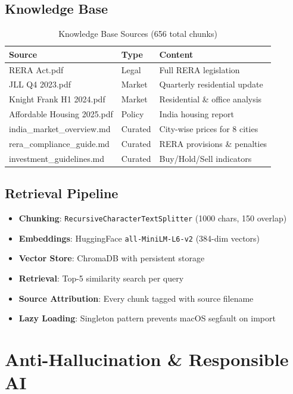 \documentclass[12pt,a4paper]{article}
\begin{document}
\subsection{Knowledge Base}
\begin{table}[H]\centering
\caption{Knowledge Base Sources (656 total chunks)}
\begin{tabular}{@{}lll@{}}
\toprule
\textbf{Source} & \textbf{Type} & \textbf{Content} \\
\midrule
RERA Act.pdf & Legal & Full RERA legislation \\
JLL Q4 2023.pdf & Market & Quarterly residential update \\
Knight Frank H1 2024.pdf & Market & Residential \& office analysis \\
Affordable Housing 2025.pdf & Policy & India housing report \\
india\_market\_overview.md & Curated & City-wise prices for 8 cities \\
rera\_compliance\_guide.md & Curated & RERA provisions \& penalties \\
investment\_guidelines.md & Curated & Buy/Hold/Sell indicators \\
\bottomrule
\end{tabular}
\end{table}

\subsection{Retrieval Pipeline}
\begin{itemize}[noitemsep]
    \item \textbf{Chunking}: \texttt{RecursiveCharacterTextSplitter} (1000 chars, 150 overlap)
    \item \textbf{Embeddings}: HuggingFace \texttt{all-MiniLM-L6-v2} (384-dim vectors)
    \item \textbf{Vector Store}: ChromaDB with persistent storage
    \item \textbf{Retrieval}: Top-5 similarity search per query
    \item \textbf{Source Attribution}: Every chunk tagged with source filename
    \item \textbf{Lazy Loading}: Singleton pattern prevents macOS segfault on import
\end{itemize}

\section{Anti-Hallucination \& Responsible AI}
\end{document}
